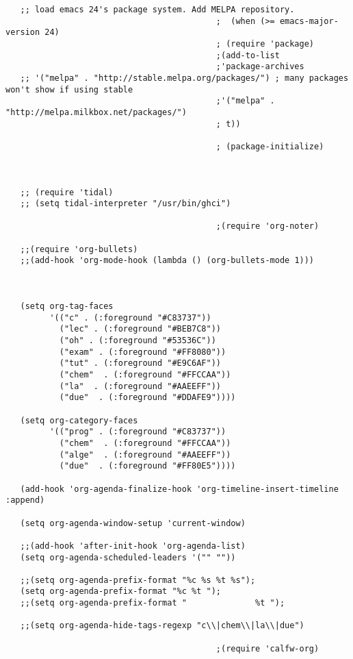 \documentclass[11pt]{article}
\begin{document}
\begin{verbatim}
   ;; load emacs 24's package system. Add MELPA repository.
                                           ;  (when (>= emacs-major-version 24)
                                           ; (require 'package)
                                           ;(add-to-list
                                           ;'package-archives
   ;; '("melpa" . "http://stable.melpa.org/packages/") ; many packages won't show if using stable
                                           ;'("melpa" . "http://melpa.milkbox.net/packages/")
                                           ; t))

                                           ; (package-initialize)



   ;; (require 'tidal)
   ;; (setq tidal-interpreter "/usr/bin/ghci")

                                           ;(require 'org-noter)

   ;;(require 'org-bullets)
   ;;(add-hook 'org-mode-hook (lambda () (org-bullets-mode 1)))



   (setq org-tag-faces
         '(("c" . (:foreground "#C83737"))
           ("lec" . (:foreground "#BEB7C8"))
           ("oh" . (:foreground "#53536C"))
           ("exam" . (:foreground "#FF8080"))
           ("tut" . (:foreground "#E9C6AF"))
           ("chem"  . (:foreground "#FFCCAA"))
           ("la"  . (:foreground "#AAEEFF"))
           ("due"  . (:foreground "#DDAFE9"))))

   (setq org-category-faces
         '(("prog" . (:foreground "#C83737"))
           ("chem"  . (:foreground "#FFCCAA"))
           ("alge"  . (:foreground "#AAEEFF"))
           ("due"  . (:foreground "#FF80E5"))))

   (add-hook 'org-agenda-finalize-hook 'org-timeline-insert-timeline :append)

   (setq org-agenda-window-setup 'current-window)

   ;;(add-hook 'after-init-hook 'org-agenda-list)
   (setq org-agenda-scheduled-leaders '("" ""))

   ;;(setq org-agenda-prefix-format "%c %s %t %s");
   (setq org-agenda-prefix-format "%c %t ");
   ;;(setq org-agenda-prefix-format "              %t ");

   ;;(setq org-agenda-hide-tags-regexp "c\\|chem\\|la\\|due")

                                           ;(require 'calfw-org)
\end{verbatim}
\end{document}
